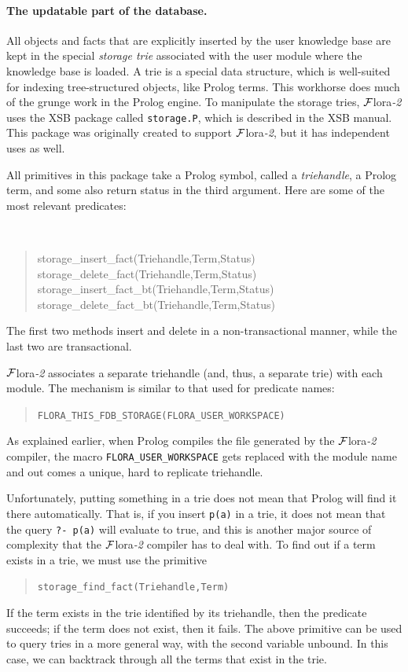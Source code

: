 \documentclass[11pt]{article}
\newcommand{\FLORA}{{\mbox{\sc ${\cal F}${lora}\rm\emph{-2}}}\xspace}
\newcommand{\FLSYSTEM}{\FLORA}
\begin{document}
{\paragraph{The updatable part of the database.}
All objects and facts that are explicitly inserted by the user knowledge
base are kept
in the special \emph{storage trie} associated with the user module where the
knowledge base is loaded. A trie is a special data structure, which is
well-suited for indexing tree-structured objects, like Prolog terms. This
workhorse does much of the grunge work in the Prolog engine. To manipulate the
storage tries, \FLSYSTEM uses the XSB package called {\tt storage.P}, which is
described in the XSB manual. This package was originally created to support
\FLSYSTEM, but it has independent uses as well.

All primitives in this package take a Prolog symbol, called a
\emph{triehandle}, a Prolog term, and some also return status in the third
argument. Here are some of the most relevant predicates:
{\tt
\begin{quote}
  storage\_insert\_fact(Triehandle,Term,Status)\\
  storage\_delete\_fact(Triehandle,Term,Status)\\
  storage\_insert\_fact\_bt(Triehandle,Term,Status)\\
  storage\_delete\_fact\_bt(Triehandle,Term,Status)
\end{quote}
}
\noindent
The first two methods insert and delete in a non-transactional manner,
while the last two are transactional.

\FLSYSTEM associates a separate triehandle (and, thus, a separate trie) with
each module. The mechanism is similar to that used for predicate names:
\begin{quote}
 \tt FLORA\_THIS\_FDB\_STORAGE(FLORA\_USER\_WORKSPACE)  
\end{quote}
As explained earlier, when Prolog compiles the file generated by the
\FLSYSTEM compiler, the macro {\tt FLORA\_USER\_WORKSPACE} gets replaced with
the module name and out comes a unique, hard to replicate triehandle.

Unfortunately, putting something in a trie does not mean that Prolog will find
it there automatically. That is, if you insert {\tt p(a)} in a trie, it
does not mean that the query {\tt ?- p(a)} will evaluate to true, and this
is another major source of complexity that the \FLSYSTEM compiler has to deal
with. To find out if a term exists in a trie, we must use the primitive
\begin{quote}
 \tt storage\_find\_fact(Triehandle,Term)  
\end{quote}
If the term exists in the trie identified by its triehandle, then the
predicate succeeds; if the term does not exist, then it fails. The above
primitive can be used to query tries in a more general way, with the second
variable unbound. In this case, we can backtrack through all the terms that
exist in the trie.

}
\end{document}
